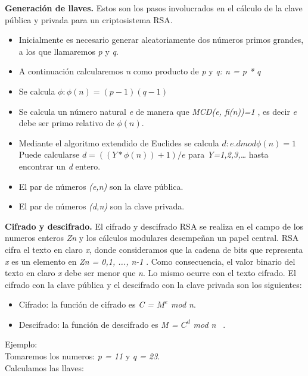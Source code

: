 \textbf{Generación de llaves.} Estos son los pasos involucrados en el cálculo de la clave pública y privada para un criptosistema
RSA. \\
\begin{itemize}
\item Inicialmente es necesario generar aleatoriamente dos números primos grandes, a los que llamaremos \textit{p} y \textit{q}.
\item A continuación calcularemos \textit{n} como producto de \textit{p} y \textit{q: n = p * q}
\item Se calcula \textit{$ \phi : \phi (n)=(p-1)(q-1)$}
\item Se calcula un número natural \textit{e} de manera que \textit{MCD(e, fi(n))=1} , es decir \textit{e} debe ser primo relativo de \textit{$\phi(n)$}.
\item Mediante el algoritmo extendido de Euclides se calcula \textit{$d: e.d mod \phi (n)=1$} Puede calcularse \textit{$d=((Y* \phi (n))+1)/e$} para \textit{Y=1,2,3,…} hasta encontrar un \textit{d} entero.
\item El par de números \textit{(e,n)} son la clave pública.
\item El par de números \textit{(d,n)} son la clave privada.
\end{itemize} 
\textbf{Cifrado y descifrado.} El cifrado y descifrado RSA se realiza en el campo de los numeros enteros \textit{Zn} y los cálculos modulares desempeñan un papel central. RSA cifra el texto en claro \textit{x}, donde consideramos que la cadena de bits que representa \textit{x} es un elemento en \textit{Zn = 0,1, ..., n-1} . Como consecuencia, el valor binario del texto en claro \textit{x} debe ser menor que \textit{n}. Lo mismo ocurre con el texto cifrado. El cifrado con la clave pública y el descifrado con la clave privada son los siguientes:

\begin{itemize}
\item Cifrado: la función de cifrado es \textit{C = $M^{e}$ mod n}.

\item Descifrado: la función de descifrado es \textit{M = $C^{d}$ mod n}  ~\cite{paar}.
\end{itemize} 

Ejemplo:\\

Tomaremos los numeros:    \textit{p = 11} y \textit{q = 23}. \\ 

Calculamos las llaves:\\

